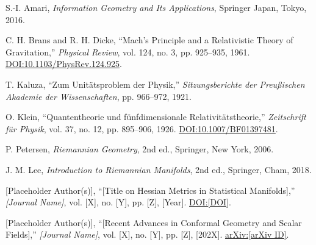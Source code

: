 \documentclass[twoside,twocolumn]{article}
\begin{document}
\begin{thebibliography}{10}

S.-I. Amari,
\textit{Information Geometry and Its Applications},
Springer Japan, Tokyo, 2016.

C. H. Brans and R. H. Dicke,
``Mach's Principle and a Relativistic Theory of Gravitation,''
\textit{Physical Review}, vol. 124, no. 3, pp. 925--935, 1961.
\href{https://doi.org/10.1103/PhysRev.124.925}{DOI:10.1103/PhysRev.124.925}.

T. Kaluza,
``Zum Unitätsproblem der Physik,''
\textit{Sitzungsberichte der Preußischen Akademie der Wissenschaften}, pp. 966--972, 1921.

O. Klein,
``Quantentheorie und fünfdimensionale Relativitätstheorie,''
\textit{Zeitschrift für Physik}, vol. 37, no. 12, pp. 895--906, 1926.
\href{https://doi.org/10.1007/BF01397481}{DOI:10.1007/BF01397481}.

P. Petersen,
\textit{Riemannian Geometry}, 2nd ed.,
Springer, New York, 2006.

J. M. Lee,
\textit{Introduction to Riemannian Manifolds}, 2nd ed.,
Springer, Cham, 2018.

[Placeholder Author(s)],
``[Title on Hessian Metrics in Statistical Manifolds],''
\textit{[Journal Name]}, vol. [X], no. [Y], pp. [Z], [Year].
\href{https://doi.org/[DOI]}{DOI:[DOI]}.

[Placeholder Author(s)],
``[Recent Advances in Conformal Geometry and Scalar Fields],''
\textit{[Journal Name]}, vol. [X], no. [Y], pp. [Z], [202X].
\href{https://arxiv.org/abs/[arXiv ID]}{arXiv:[arXiv ID]}.


\end{thebibliography}
\end{document}
